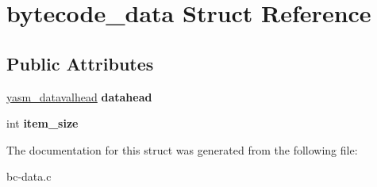 \hypertarget{structbytecode__data}{\section{bytecode\-\_\-data Struct Reference}
\label{structbytecode__data}
}
\subsection*{Public Attributes}
\begin{DoxyCompactItemize}
\item 
\hypertarget{structbytecode__data_aff9f010b945e09de9e8d0013ab6a7dc5}{\hyperlink{bytecode_8h_a16269c7339747342414e0259bb6246d5}{yasm\-\_\-datavalhead} {\bfseries datahead}}\label{structbytecode__data_aff9f010b945e09de9e8d0013ab6a7dc5}

\item 
\hypertarget{structbytecode__data_a088af19d5a82c2ce969b2d67f73d3625}{int {\bfseries item\-\_\-size}}\label{structbytecode__data_a088af19d5a82c2ce969b2d67f73d3625}

\end{DoxyCompactItemize}


The documentation for this struct was generated from the following file\-:\begin{DoxyCompactItemize}
\item 
bc-\/data.\-c\end{DoxyCompactItemize}
